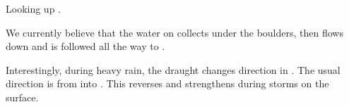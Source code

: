 \begin{marginfigure}
\checkoddpage \ifoddpage \forcerectofloat \else \forceversofloat \fi
\centering
 \caption{Looking up \protect{}. }
 \label{zimmer composite}
\end{marginfigure}

We currently believe that the water on  collects under the boulders, then
flows down  and is followed all the way to .

Interestingly, during heavy rain, the draught changes direction in
. The usual direction is from  into .
This reverses and strengthens during storms on the surface.

